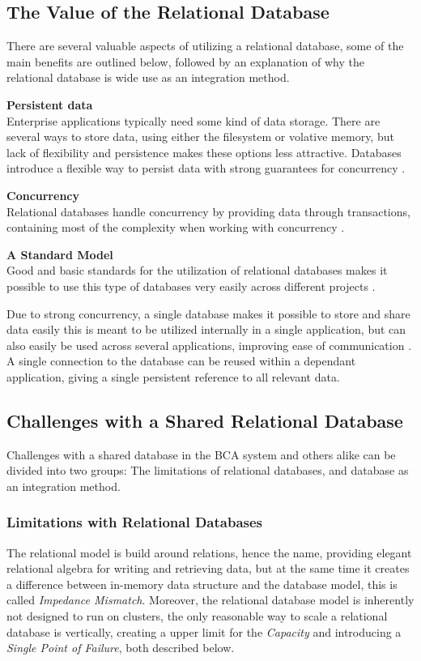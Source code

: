 {\subsection{The Value of the Relational Database}
There are several valuable aspects of utilizing a relational database, some of the main benefits are outlined below, followed by an explanation of why the relational database is wide use as an integration method.

\textbf{Persistent data}\\
Enterprise applications typically need some kind of data storage. There are several ways to store data, using either the filesystem or volative memory, but lack of flexibility and persistence makes these options less attractive. Databases introduce a flexible way to persist data with strong guarantees for concurrency \cite[p.~3]{sadalage2012nosql}.

\textbf{Concurrency}\\
Relational databases handle concurrency by providing data through transactions, containing most of the complexity when working with concurrency \cite[p.~4]{sadalage2012nosql}. 

\textbf{A Standard Model}\\
Good and basic standards for the utilization of relational databases makes it possible to use this type of databases very easily across different projects \cite[p.~4]{sadalage2012nosql}. 



Due to strong concurrency, a single database makes it possible to store and share data easily this is meant to be utilized internally in a single application, but can also easily be used across several applications, improving ease of communication \cite[p.~4]{sadalage2012nosql}. A single connection to the database can be reused within a dependant application, giving a single persistent reference to all relevant data.

\subsection{Challenges with a Shared Relational Database}
Challenges with a shared database in the BCA system and others alike can be divided into two groups: The limitations of relational databases, and database as an integration method.

\subsubsection{Limitations with Relational Databases}
The relational model is build around relations, hence the name, providing elegant relational algebra for writing and retrieving data, but at the same time it creates a difference between in-memory data structure and the database model, this is called \textit{Impedance Mismatch}. Moreover, the relational database model is inherently not designed to run on clusters, the only reasonable way to scale a relational database is vertically, creating a upper limit for the \textit{Capacity} and introducing a \textit{Single Point of Failure}, both described below. 

}
